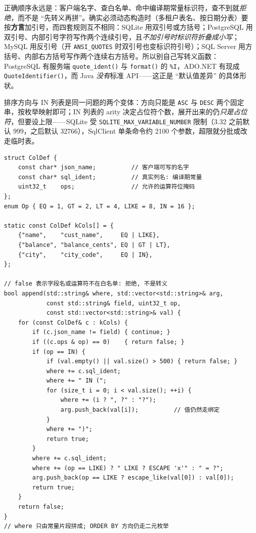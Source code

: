 \documentclass[12pt,a4paper,fontset=fandol]{ctexbook}
\newcommand{\Fn}[1]{\texttt{#1()}}
\newcommand{\Tp}[1]{\texttt{#1}}
\begin{document}
\begin{warning}[title=标识符只能白名单，不要手写转义]
正确顺序永远是：客户端名字、查白名单、命中编译期常量标识符，查不到就\emph{拒绝}，而不是 ``先转义再拼''。确实必须动态构造时（多租户表名、按日期分表）要按\textbf{方言}加引号，而四套规则互不相同：SQLite 用双引号或方括号；PostgreSQL 用双引号、内部引号字符写作两个连续引号，且\emph{不加引号时标识符折叠成小写}；MySQL 用反引号（开 \Tp{ANSI\_QUOTES} 时双引号也变标识符引号）；SQL Server 用方括号、内部右方括号写作两个连续右方括号。所以别自己写转义函数：PostgreSQL 有服务端 \Fn{quote\_ident} 与 \Fn{format} 的 \texttt{\%I}，ADO.NET 有现成 \Fn{Quote\allowbreak Identifier}，而 Java \emph{没有}标准 API——这正是 ``默认值差异'' 的具体形状。
\end{warning}

排序方向与 IN 列表是同一问题的两个变体：方向只能是 \texttt{ASC} 与 \texttt{DESC} 两个固定串，按枚举映射即可；IN 列表的 arity 决定占位符个数，展开出来的仍\emph{只是占位符}，但要设上限——SQLite 受 \Tp{SQLITE\_MAX\_\allowbreak VARIABLE\_\allowbreak NUMBER} 限制（3.32 之前默认 999，之后默认 32766），SqlClient 单条命令约 2100 个参数，超限就分批或改走临时表。

\begin{lstlisting}[caption={C/C++：只从枚举白名单组合的动态过滤构造器}]
struct ColDef {
    const char* json_name;          // 客户端可写的名字
    const char* sql_ident;          // 真实列名: 编译期常量
    uint32_t    ops;                // 允许的运算符位掩码
};
enum Op { EQ = 1, GT = 2, LT = 4, LIKE = 8, IN = 16 };

static const ColDef kCols[] = {
    {"name",    "cust_name",     EQ | LIKE},
    {"balance", "balance_cents", EQ | GT | LT},
    {"city",    "city_code",     EQ | IN},
};

// false 表示字段名或运算符不在白名单: 拒绝, 不是转义
bool append(std::string& where, std::vector<std::string>& arg,
            const std::string& field, uint32_t op,
            const std::vector<std::string>& val) {
    for (const ColDef& c : kCols) {
        if (c.json_name != field) { continue; }
        if ((c.ops & op) == 0)    { return false; }
        if (op == IN) {
            if (val.empty() || val.size() > 500) { return false; }
            where += c.sql_ident;
            where += " IN (";
            for (size_t i = 0; i < val.size(); ++i) {
                where += (i ? ", ?" : "?");
                arg.push_back(val[i]);          // 值仍然走绑定
            }
            where += ")";
            return true;
        }
        where += c.sql_ident;
        where += (op == LIKE) ? " LIKE ? ESCAPE 'x'" : " = ?";
        arg.push_back(op == LIKE ? escape_like(val[0]) : val[0]);
        return true;
    }
    return false;
}
// where 只由常量片段拼成; ORDER BY 方向仍走二元枚举
\end{lstlisting}
\end{document}
